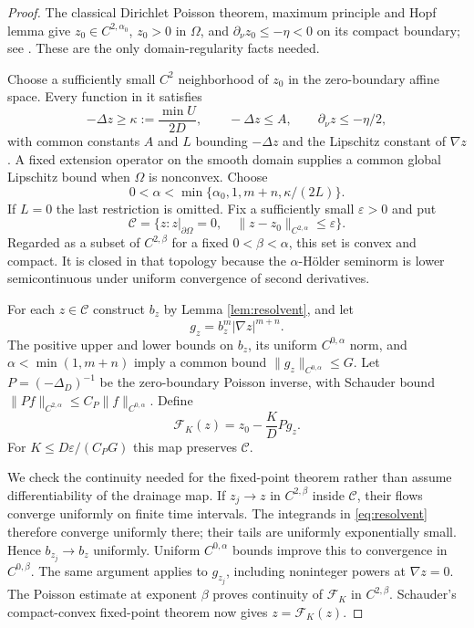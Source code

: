 \documentclass[11pt,a4paper]{article}
\theoremstyle{definition}\newtheorem{definition}[theorem]{Definition}
\theoremstyle{remark}\newtheorem{remark}[theorem]{Remark}
\begin{document}
\begin{proof}
The classical Dirichlet Poisson theorem, maximum principle and Hopf lemma give $z_0\in C^{2,\alpha_0}$, $z_0>0$ in $\Omega$, and $\partial_\nu z_0\leq-\eta<0$ on its compact boundary; see \cite[Chapters 3 and 6, in particular Theorem 6.14 for the Dirichlet problem]{GT}. These are the only domain-regularity facts needed.

Choose a sufficiently small $C^2$ neighborhood of $z_0$ in the zero-boundary affine space. Every function in it satisfies
\[
 -\Delta z\geq\kappa:=\frac{\min U}{2D},\qquad
 -\Delta z\leq A,\qquad \partial_\nu z\leq-\eta/2,
\]
with common constants $A$ and $L$ bounding $-\Delta z$ and the Lipschitz constant of $\nabla z$. A fixed extension operator on the smooth domain supplies a common global Lipschitz bound when $\Omega$ is nonconvex. Choose
\[
 0<\alpha<\min\{\alpha_0,1,m+n,\kappa/(2L)\}.
\]
If $L=0$ the last restriction is omitted. Fix a sufficiently small $\varepsilon>0$ and put
\[
 \mathcal C=\{z:z|_{\partial\Omega}=0,\quad
 \|z-z_0\|_{C^{2,\alpha}}\leq\varepsilon\}.
\]
Regarded as a subset of $C^{2,\beta}$ for a fixed $0<\beta<\alpha$, this set is convex and compact. It is closed in that topology because the $\alpha$-H\"older seminorm is lower semicontinuous under uniform convergence of second derivatives.

For each $z\in\mathcal C$ construct $b_z$ by Lemma \ref{lem:resolvent}, and let
\[
 g_z=b_z^m|\nabla z|^{m+n}.
\]
The positive upper and lower bounds on $b_z$, its uniform $C^{0,\alpha}$ norm, and $\alpha<\min(1,m+n)$ imply a common bound $\|g_z\|_{C^{0,\alpha}}\leq G$. Let $P=(-\Delta_D)^{-1}$ be the zero-boundary Poisson inverse, with Schauder bound $\|Pf\|_{C^{2,\alpha}}\leq C_P\|f\|_{C^{0,\alpha}}$. Define
\begin{equation}
 \mathcal F_K(z)=z_0-\frac K D P g_z.\label{eq:fixedmap}
\end{equation}
For $K\leq D\varepsilon/(C_PG)$ this map preserves $\mathcal C$.

We check the continuity needed for the fixed-point theorem rather than assume differentiability of the drainage map. If $z_j\to z$ in $C^{2,\beta}$ inside $\mathcal C$, their flows converge uniformly on finite time intervals. The integrands in \eqref{eq:resolvent} therefore converge uniformly there; their tails are uniformly exponentially small. Hence $b_{z_j}\to b_z$ uniformly. Uniform $C^{0,\alpha}$ bounds improve this to convergence in $C^{0,\beta}$. The same argument applies to $g_{z_j}$, including noninteger powers at $\nabla z=0$. The Poisson estimate at exponent $\beta$ proves continuity of $\mathcal F_K$ in $C^{2,\beta}$. Schauder's compact-convex fixed-point theorem now gives $z=\mathcal F_K(z)$.


\end{proof}
\end{document}
